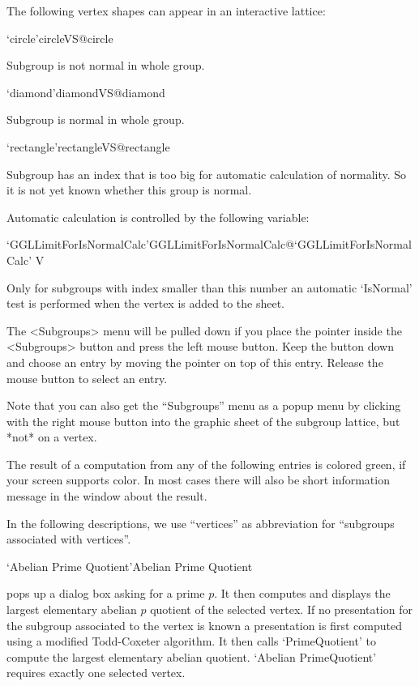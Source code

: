The following vertex shapes can appear in an interactive lattice:

\>`circle'{circleVS}@{circle}

  Subgroup is not normal in whole group.

\>`diamond'{diamondVS}@{diamond}

  Subgroup is normal in whole group.

\>`rectangle'{rectangleVS}@{rectangle}

  Subgroup has an index that is too big for automatic calculation of
  normality. So it is not yet known whether this group is normal.

\bigskip

Automatic calculation is controlled by the following variable:

\>`GGLLimitForIsNormalCalc'{GGLLimitForIsNormalCalc}@{`GGLLimitForIsNormalCalc'} V

  Only for subgroups with index smaller than this number an automatic
  `IsNormal' test is performed when the vertex is added to the sheet.



The <Subgroups> menu will be pulled down  if you place the pointer inside
the <Subgroups> button and press the  left mouse button.  Keep the button
down and  choose an entry by  moving  the pointer on   top of this entry.
Release the mouse button to select an entry.

Note that you can also get the ``Subgroups'' menu as a popup menu by
clicking with the right mouse button into the graphic sheet of the subgroup
lattice, but *not* on a vertex.

The result of  a computation  from any  of  the following entries  is
colored green, if  your screen supports color.   In most cases there will
also be short information message in the {\GAP} window about the result.

In  the following descriptions, we  use ``vertices'' as abbreviation for
``subgroups associated with vertices''.

\>`Abelian Prime Quotient'{Abelian Prime Quotient}

pops  up a dialog  box asking  for a  prime  $p$.  It  then computes  and
displays the largest elementary   abelian  $p$ quotient of  the  selected
vertex.  If no presentation for the  subgroup associated to the vertex is
known   a presentation is  first computed  using  a modified Todd-Coxeter
algorithm.     It then calls    `PrimeQuotient' to   compute  the largest
elementary abelian quotient.  `Abelian PrimeQuotient' requires exactly one
selected vertex. 

